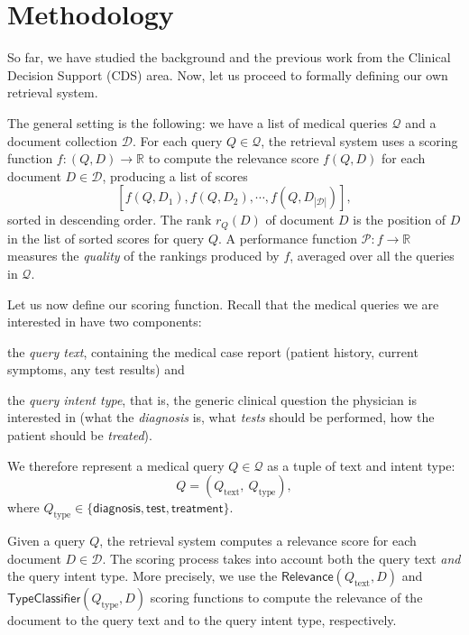 \chapter{Methodology}\label{meth}

So far, we have studied the background and the previous work from the Clinical Decision Support (CDS) area.
Now, let us proceed to formally defining our own retrieval system.

The general setting is the following: we have a list of medical queries $\mathcal{Q}$ and a document collection $\mathcal{D}$.
For each query $Q \in \mathcal{Q}$,
the retrieval system uses a scoring function $f:(Q,D)\rightarrow\mathbb{R}$ to compute the relevance score $f(Q,D)$
for each
document $D\in\mathcal{D}$, producing a list of scores \[[f(Q,D_1), f(Q,D_2), \cdots, f(Q,D_{|\mathcal{D}|})],\]
sorted in descending order.
The rank $r_Q(D)$ of document $D$ is the position of $D$ in the list of sorted scores for query $Q$.
A performance function $\mathcal{P}:f\rightarrow\mathbb{R}$ measures the \emph{quality} of the rankings produced by
$f$, averaged over all the queries in $ \mathcal{Q}$.

Let us now define our scoring function.
Recall that the medical queries we are interested in have two components:
\begin{enumerate*}[label=\arabic*)]
 \item the \emph{query text}, containing the medical case report (patient history, current symptoms, any test results) and
 \item the \emph{query intent type}, that is, the generic clinical question the physician is interested in
 (what the \emph{diagnosis} is, what \emph{tests} should be performed, how the patient should be \emph{treated}).
\end{enumerate*}
We therefore represent a medical query $Q\in\mathcal{Q}$ as a tuple of text and intent type: \[Q = \left(Q_{\text{text}},\ Q_{\text{type}}\right),\]
where $Q_{\text{type}} \in \{\textsf{diagnosis}, \textsf{test}, \textsf{treatment}\}$.

Given a query $Q$, the retrieval system computes a relevance score for each document $D\in\mathcal{D}$.
The scoring process takes into account both the query text \emph{and} the query intent type.
More precisely, we use the
$\textsf{Relevance}(Q_{\text{text}}, D)$ and $\textsf{TypeClassifier}(Q_{\text{type}}, D)$
scoring functions to compute the relevance of the document to the query text and to the query intent type, respectively.

